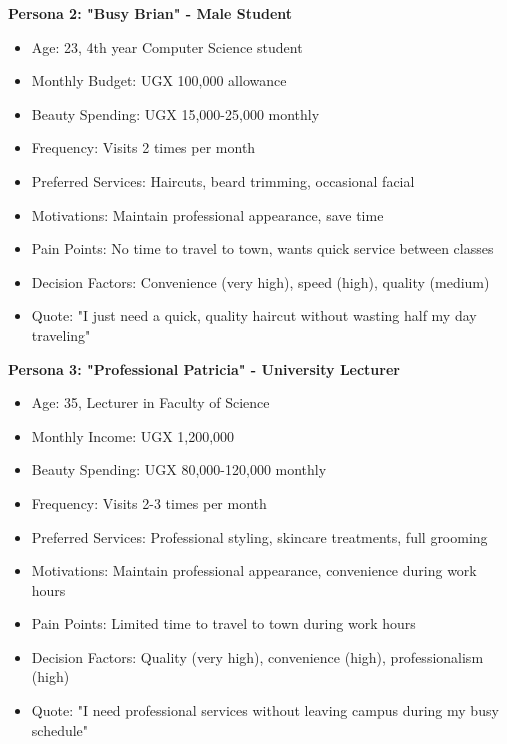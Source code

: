 \documentclass[a4paper,12pt]{article}
\begin{document}
\textbf{Persona 2: "Busy Brian" - Male Student}
\begin{itemize}[leftmargin=2em]
    \item Age: 23, 4th year Computer Science student
    \item Monthly Budget: UGX 100,000 allowance
    \item Beauty Spending: UGX 15,000-25,000 monthly
    \item Frequency: Visits 2 times per month
    \item Preferred Services: Haircuts, beard trimming, occasional facial
    \item Motivations: Maintain professional appearance, save time
    \item Pain Points: No time to travel to town, wants quick service between classes
    \item Decision Factors: Convenience (very high), speed (high), quality (medium)
    \item Quote: "I just need a quick, quality haircut without wasting half my day traveling"
\end{itemize}

\textbf{Persona 3: "Professional Patricia" - University Lecturer}
\begin{itemize}[leftmargin=2em]
    \item Age: 35, Lecturer in Faculty of Science
    \item Monthly Income: UGX 1,200,000
    \item Beauty Spending: UGX 80,000-120,000 monthly
    \item Frequency: Visits 2-3 times per month
    \item Preferred Services: Professional styling, skincare treatments, full grooming
    \item Motivations: Maintain professional appearance, convenience during work hours
    \item Pain Points: Limited time to travel to town during work hours
    \item Decision Factors: Quality (very high), convenience (high), professionalism (high)
    \item Quote: "I need professional services without leaving campus during my busy schedule"
\end{itemize}
\end{document}

